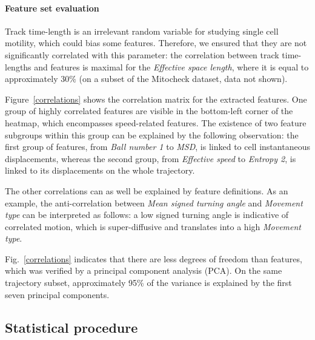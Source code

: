 \paragraph{Feature set evaluation\\}
Track time-length is an irrelevant random variable for studying single cell motility, which could bias some features. Therefore, we ensured that they are not significantly correlated with this parameter: the correlation between track time-lengths and features is maximal for the \textit{Effective space length}, where it is equal to approximately $30\%$ (on a subset of the Mitocheck dataset, data not shown).

Figure~\ref{correlations} shows the correlation matrix for the
extracted features. 
One group of highly correlated features are visible in the bottom-left
corner of the heatmap, which encompasses speed-related features. The
existence of two feature subgroups within this group can be explained
by the following observation: the first group of features, from
\textit{Ball number 1} to \textit{MSD}, is linked to cell
instantaneous displacements, whereas the second group, from
\textit{Effective speed} to \textit{Entropy 2}, is linked to its
displacements on the whole trajectory.  

The other correlations can as well be explained by feature definitions. As an example, the anti-correlation between \textit{Mean signed turning angle} and \textit{Movement type} can be interpreted as follows: a low signed turning angle is indicative of correlated motion, which is super-diffusive and translates into a high \textit{Movement type}.

Fig.~\ref{correlations} indicates that there are less degrees of
freedom than features, which was verified by a principal component
analysis (PCA). On the same trajectory subset, approximately 95\% of
the variance is explained by the first seven principal components. 

\subsection{Statistical procedure}
\label{sec:stats}
